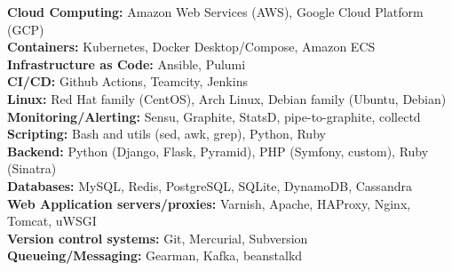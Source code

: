 \documentclass[margin,line]{resume}
\begin{document}
\begin{resume}
    \textbf{Cloud Computing:} Amazon Web Services (AWS), Google Cloud Platform (GCP)\\
    \textbf{Containers:} Kubernetes, Docker Desktop/Compose, Amazon ECS\\
    \textbf{Infrastructure as Code:} Ansible, Pulumi\\
    \textbf{CI/CD:} Github Actions, Teamcity, Jenkins\\
    \textbf{Linux:} Red Hat family (CentOS), Arch Linux, Debian family (Ubuntu, Debian)\\
    \textbf{Monitoring/Alerting:} Sensu, Graphite, StatsD, pipe-to-graphite, collectd\\
    \textbf{Scripting:} Bash and utils (sed, awk, grep), Python, Ruby\\
    \textbf{Backend:} Python (Django, Flask, Pyramid), PHP (Symfony, custom), Ruby (Sinatra)\\
    \textbf{Databases:} MySQL, Redis, PostgreSQL, SQLite, DynamoDB, Cassandra\\
    \textbf{Web Application servers/proxies:} Varnish, Apache, HAProxy, Nginx, Tomcat, uWSGI\\
    \textbf{Version control systems:} Git, Mercurial, Subversion\\
    \textbf{Queueing/Messaging:} Gearman, Kafka, beanstalkd


\end{resume}
\end{document}
